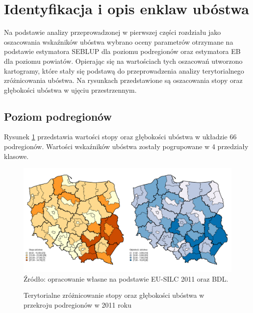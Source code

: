 \section{Identyfikacja i opis enklaw ubóstwa}

Na podstawie analizy przeprowadzonej w pierwszej części rozdziału jako oszacowania wskaźników ubóstwa wybrano oceny parametrów otrzymane na podstawie estymatora SEBLUP dla poziomu podregionów oraz estymatora EB dla poziomu powiatów. Opierając się na wartościach tych oszacowań utworzono kartogramy, które stały się podstawą do przeprowadzenia analizy terytorialnego zróżnicowania ubóstwa. Na rysunkach przedstawione są oszacowania stopy oraz głębokości ubóstwa w ujęciu przestrzennym.

\subsection{Poziom podregionów}

Rysunek \ref{fig:fh_nts3_hcr_pgi_4} przedstawia wartości stopy oraz głębokości ubóstwa w układzie 66 podregionów. Wartości wskaźników ubóstwa zostały pogrupowane w 4 przedziały klasowe.

\begin{figure}[ht]
\caption{Terytorialne zróżnicowanie stopy oraz głębokości ubóstwa w przekroju podregionów w 2011 roku}
\centering
\includegraphics[width=\textwidth]{05_wykresy/fh_nts3_hcr_pgi_4.png}\\
\small{Źródło: opracowanie własne na podstawie EU-SILC 2011 oraz BDL.}
\label{fig:fh_nts3_hcr_pgi_4}
\end{figure}

